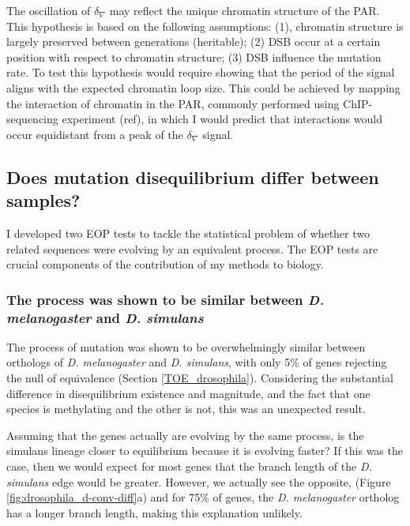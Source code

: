 The oscillation of $\delta_\nabla$ may reflect the unique chromatin structure of the PAR.
This hypothesis is based on the following assumptions: (1), chromatin structure is largely preserved between generations (heritable); (2) DSB occur at a certain position with respect to chromatin structure; (3) DSB influence the mutation rate. To test this hypothesis would require showing that the period of the signal aligns with the expected chromatin loop size. This could be achieved by mapping the interaction of chromatin in the PAR, commonly performed using ChIP-sequencing experiment (ref), in which I would predict that interactions would occur equidistant from a peak of the $\delta_\nabla$ signal.

\subsection{Does mutation disequilibrium differ between samples?}

I developed two EOP tests to tackle the statistical problem of whether two related sequences were evolving by an equivalent process. The EOP tests are crucial components of the contribution of my methods to biology. 

\subsubsection{The process was shown to be similar between \textit{D. melanogaster} and \textit{D. simulans} }

The process of mutation was shown to be overwhelmingly similar between orthologs of \textit{D. melanogaster} and \textit{D. simulans}, with only 5\% of genes rejecting the null of equivalence (Section \ref{TOE_drosophila}). Considering the substantial difference in disequilibrium existence and magnitude, and the fact that one species is methylating and the other is not, this was an unexpected result. 

Assuming that the genes actually are evolving by the same process, is the simulans lineage closer to equilibrium because it is evolving faster? If this was the case, then we would expect for most genes that the branch length of the \textit{D. simulans} edge would be greater. However, we actually see the opposite, (Figure \ref{fig:drosophila_d-conv-diff}a) and for 75\% of genes, the \textit{D. melanogaster} ortholog has a longer branch length, making this explanation unlikely. 

